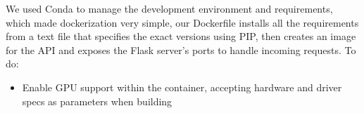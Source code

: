 We used Conda to manage the development environment and requirements, which made dockerization very simple, our Dockerfile installs all the requirements from a text file that specifies the exact versions using PIP, then creates an image for the API and exposes the Flask server's ports to handle incoming requests.
To do:
\begin{itemize}
    \item Enable GPU support within the container, accepting hardware and driver specs as parameters when building
\end{itemize}
